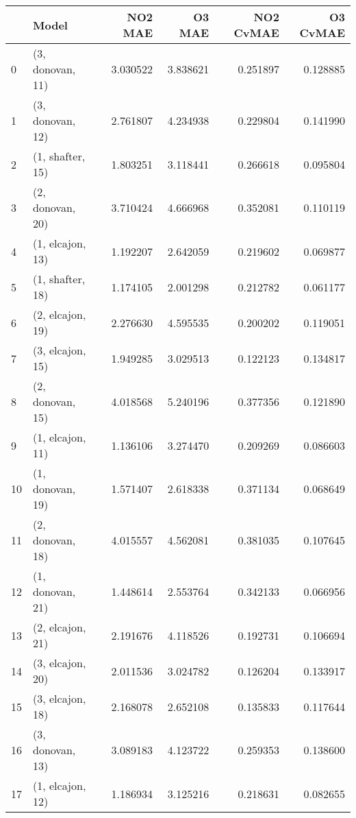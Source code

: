 \begin{tabular}{llrrrr}
\toprule
{} &             Model &   NO2 MAE &    O3 MAE &  NO2 CvMAE &  O3 CvMAE \\
\midrule
0  &  (3, donovan, 11) &  3.030522 &  3.838621 &   0.251897 &  0.128885 \\
1  &  (3, donovan, 12) &  2.761807 &  4.234938 &   0.229804 &  0.141990 \\
2  &  (1, shafter, 15) &  1.803251 &  3.118441 &   0.266618 &  0.095804 \\
3  &  (2, donovan, 20) &  3.710424 &  4.666968 &   0.352081 &  0.110119 \\
4  &  (1, elcajon, 13) &  1.192207 &  2.642059 &   0.219602 &  0.069877 \\
5  &  (1, shafter, 18) &  1.174105 &  2.001298 &   0.212782 &  0.061177 \\
6  &  (2, elcajon, 19) &  2.276630 &  4.595535 &   0.200202 &  0.119051 \\
7  &  (3, elcajon, 15) &  1.949285 &  3.029513 &   0.122123 &  0.134817 \\
8  &  (2, donovan, 15) &  4.018568 &  5.240196 &   0.377356 &  0.121890 \\
9  &  (1, elcajon, 11) &  1.136106 &  3.274470 &   0.209269 &  0.086603 \\
10 &  (1, donovan, 19) &  1.571407 &  2.618338 &   0.371134 &  0.068649 \\
11 &  (2, donovan, 18) &  4.015557 &  4.562081 &   0.381035 &  0.107645 \\
12 &  (1, donovan, 21) &  1.448614 &  2.553764 &   0.342133 &  0.066956 \\
13 &  (2, elcajon, 21) &  2.191676 &  4.118526 &   0.192731 &  0.106694 \\
14 &  (3, elcajon, 20) &  2.011536 &  3.024782 &   0.126204 &  0.133917 \\
15 &  (3, elcajon, 18) &  2.168078 &  2.652108 &   0.135833 &  0.117644 \\
16 &  (3, donovan, 13) &  3.089183 &  4.123722 &   0.259353 &  0.138600 \\
17 &  (1, elcajon, 12) &  1.186934 &  3.125216 &   0.218631 &  0.082655 \\
\bottomrule
\end{tabular}
